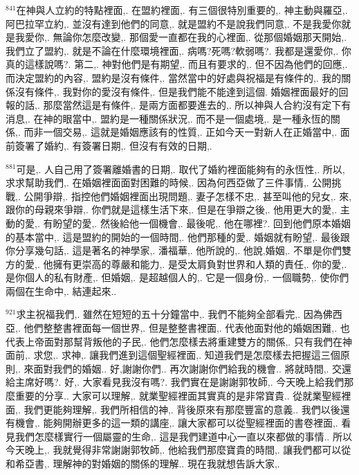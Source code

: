 \documentclass{book}
\begin{document}
$^{841}$在神與人立約的特點裡面,.
在盟約裡面,.
有三個很特別重要的,.
神主動與羅亞,.
阿巴拉罕立約,.
並沒有達到他們的同意,.
就是盟約不是說我們同意,.
不是我愛你就是我愛你,.
無論你怎麼改變,.
那個愛一直都在我的心裡面,.
從那個婚姻那天開始,.
我們立了盟約,.
就是不論在什麼環境裡面,.
病嗎?死嗎?軟弱嗎?.
我都是還愛你,.
你真的這樣說嗎?.
第二,.
神對他們是有期望,.
而且有要求的,.
但不因為他們的回應,.
而決定盟約的內容,.
盟約是沒有條件,.
當然當中的好處與祝福是有條件的,.
我的關係沒有條件,.
我對你的愛沒有條件,.
但是我們能不能達到這個.
婚姻裡面最好的回報的話,.
那麼當然這是有條件,.
是兩方面都要進去的,.
所以神與人合約沒有定下有消息,.
在神的眼當中,.
盟約是一種關係狀況,.
而不是一個處境,.
是一種永恆的關係,.
而非一個交易,.
這就是婚姻應該有的性質,.
正如今天一對新人在正婚當中,.
面前簽署了婚約,.
有簽署日期,.
但沒有有效的日期,.

$^{881}$可是,.
人自己用了簽署離婚書的日期,.
取代了婚約裡面能夠有的永恆性,.
所以,求求幫助我們,.
在婚姻裡面面對困難的時候,.
因為何西亞做了三件事情,.
公開挑戰,.
公開爭辯,.
指控他們婚姻裡面出現問題,.
妻子怎樣不忠,.
甚至叫他的兒女,.
來,跟你的母親來爭辯,.
你們就是這樣生活下來,.
但是在爭辯之後,.
他用更大的愛,.
主動的愛,.
有盼望的愛,.
然後給他一個機會,.
最後呢,.
他在哪裡?.
回到他們原本婚姻的基本當中,.
這是盟約的開始的一個時間,.
他們那種的愛,.
婚姻就有盼望,.
最後跟你分享幾句話,.
這是著名的神學家,.
潘福華,.
他所說的,.
他說,婚姻,.
不單是你們雙方的愛,.
他擁有更崇高的尊嚴和能力,.
是受太肩負對世界和人類的責任,.
你的愛,.
是你個人的私有財產,.
但婚姻,.
是超越個人的,.
它是一個身份,.
一個職勢,.
使你們兩個在生命中,.
結連起來..

$^{921}$求主祝福我們,.
雖然在短短的五十分鐘當中,.
我們不能夠全部看完,.
因為佛西亞,.
他們整整書裡面每一個世界,.
但是整整書裡面,.
代表他面對他的婚姻困難,.
也代表上帝面對那幫背叛他的子民,.
他們怎麼樣去將重建雙方的關係,.
只有我們在神面前,.
求您,.
求神,.
讓我們進到這個聖經裡面,.
知道我們是怎麼樣去把握這三個原則,.
來面對我們的婚姻..
好,謝謝你們..
再次謝謝你們給我的機會..
將就時間,.
交還給主席好嗎?.
好,.
大家看見我沒有嗎?.
我們實在是謝謝郭牧師,.
今天晚上給我們那麼重要的分享..
大家可以理解,.
就業聖經裡面其實真的是非常寶貴..
從就業聖經裡面,.
我們更能夠理解,.
我們所相信的神,.
背後原來有那麼豐富的意義..
我們以後還有機會,.
能夠開辦更多的這一類的講座,.
讓大家都可以從聖經裡面的書卷裡面,.
看見我們怎麼樣實行一個屬靈的生命,.
這是我們建道中心一直以來都做的事情..
所以今天晚上,.
我就覺得非常謝謝郭牧師,.
他給我們那麼寶貴的時間,.
讓我們都可以從和希亞書,.
理解神的對婚姻的關係的理解..
現在我就想告訴大家,.
\end{document}
